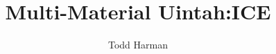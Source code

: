 \documentclass[fleqn]{article}
\begin{document}

%
\setcounter{equation}{0}
\setcounter{figure}{0}
\setcounter{section}{0}
%
%

%
\title{Multi-Material Uintah:ICE}
\vspace{5in}
\author{Todd Harman}
\maketitle
\newpage
\setcounter{secnumdepth}{-2}
\tableofcontents
\newpage
\end{document}
